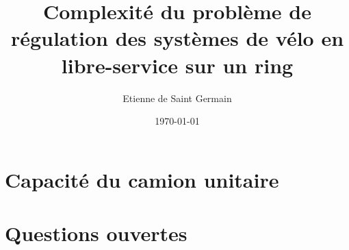 \documentclass[twoside,11pt,openany,a4paper]{rapport}
\begin{document}
\title{Complexité du problème de régulation des systèmes de vélo en libre-service sur un ring}
\author{Etienne de Saint Germain}
\date{\today}



\cleardoublepage







\tableofcontents
{}
\listoffigures
{}



\cleardoublepage









\chapter{Capacité du camion unitaire}

\chapter{Questions ouvertes}






\backmatter
\end{document}
